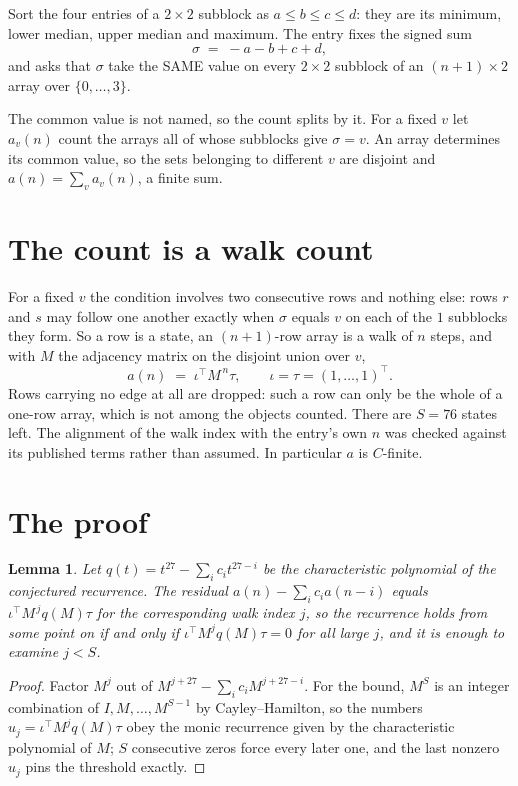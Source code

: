 \documentclass[11pt,a4paper]{article}
\theoremstyle{plain}
\newtheorem{lemma}[theorem]{Lemma}
\theoremstyle{definition}
\begin{document}
Sort the four entries of a $2\times2$ subblock as $a\le b\le c\le d$: they
are its minimum, lower median, upper median and maximum. The entry fixes the signed sum
\[
\sigma\;=\;-a-b+c+d,
\]
and asks that $\sigma$ take the SAME value on every $2\times2$ subblock of an
$(n+1)\times2$ array over $\{0,\dots,3\}$.

The common value is not named, so the count splits by it. For a fixed $v$ let $a_v(n)$ count
the arrays all of whose subblocks give $\sigma=v$. An array determines its common value, so
the sets belonging to different $v$ are disjoint and $a(n)=\sum_v a_v(n)$, a finite sum.


\section{The count is a walk count}

For a fixed $v$ the condition involves two consecutive rows and nothing
else: rows $r$ and $s$ may follow one another exactly when $\sigma$ equals $v$ on each of the
$1$ subblocks they form. So a row is a state, an $(n+1)$-row array is a walk of $n$
steps, and with $M$ the adjacency matrix on the disjoint union over $v$,
\[
a(n)\;=\;\iota^{\!\top}M^{\,n}\tau,\qquad\iota=\tau=(1,\dots,1)^{\!\top} .
\]
Rows carrying no edge at all are dropped: such a row can only be the whole of a one-row
array, which is not among the objects counted. There are $S=76$ states left.
The alignment of the walk index with the entry's own $n$ was checked against its published
terms rather than assumed. In particular $a$ is $C$-finite.

\section{The proof}

\begin{lemma}\label{lem:crit}
Let $q(t)=t^{27}-\sum_i c_it^{27-i}$ be the characteristic polynomial of the
conjectured recurrence. The residual $a(n)-\sum_ic_ia(n-i)$ equals
$\iota^{\!\top}M^{\,j}q(M)\tau$ for the corresponding walk index $j$, so the recurrence
holds from some point on if and only if $\iota^{\!\top}M^{j}q(M)\tau=0$ for all large $j$,
and it is enough to examine $j<S$.
\end{lemma}

\begin{proof}
Factor $M^{j}$ out of $M^{j+27}-\sum_ic_iM^{j+27-i}$. For the bound, $M^{S}$
is an integer combination of $I,M,\dots,M^{S-1}$ by Cayley--Hamilton, so the numbers
$u_j=\iota^{\!\top}M^{j}q(M)\tau$ obey the monic recurrence given by the characteristic
polynomial of $M$; $S$ consecutive zeros force every later one, and the last nonzero $u_j$
pins the threshold exactly.
\end{proof}
\end{document}
